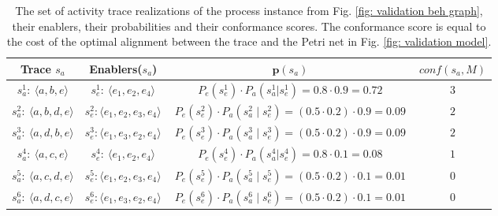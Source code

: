 \begin{table}[h]
	\begin{adjustbox}{width=\columnwidth,center}
	\begin{tabular}{cccc}
		\textbf{Trace $s_a$} & \textbf{Enablers}($s_a$) & \textbf{$\textbf{p}(s_a)$} & \textbf{$conf(s_a,M)$}
		\\ \hline
	\multicolumn{1}{|c|}{$~s_a^{1}: ~ \langle a,b,e \rangle~$} &                                                 	\multicolumn{1}{|c|}{$~s_e^{1}: ~ \langle e_1,e_2,e_4 \rangle~$} & 
	\multicolumn{1}{|c|}{$P_e(s_e^1) \cdot P_a(s_a^1 | s_e^1) 
		=  0.8 \cdot 0.9  = 0.72$}  & 
	\multicolumn{1}{|c|}{$3$} 
\\ \hline  
	\multicolumn{1}{|c|}{$s_a^{2}: ~ \langle a,b,d,e \rangle$} & 
	\multicolumn{1}{|c|}{$s_e^2: \langle e_1,e_2,e_3,e_4 \rangle$} & 
	\multicolumn{1}{|c|}{$~ P_e(s_e^2) \cdot P_a(s_a^2 \mid s_e^2) = (0.5 \cdot 0.2) \cdot 0.9 = 0.09 ~$} &
	\multicolumn{1}{|c|}{$~ 2 ~$}
\\ \hline
	\multicolumn{1}{|c|}{$s_a^{3}: ~ \langle a,d,b,e \rangle$} & 
	\multicolumn{1}{|c|}{$s_e^3: \langle e_1,e_3,e_2,e_4 \rangle$} & 
	\multicolumn{1}{|c|}{$~ P_e(s_e^3) \cdot P_a(s_a^3 \mid s_e^3) =  (0.5 \cdot 0.2) \cdot 0.9 = 0.09 ~$} &
	\multicolumn{1}{|c|}{$~ 2 ~$}
\\ \hline
	\multicolumn{1}{|c|}{$~s_a^{4}: ~ \langle a,c,e \rangle~$} &                                                       	\multicolumn{1}{|c|}{$~s_e^{4}: ~ \langle e_1,e_2,e_4 \rangle~$} & 
	\multicolumn{1}{|c|}{$P_e(s_e^4) \cdot P_a(s_a^4 | s_e^4)
		=0.8 \cdot 0.1 = 0.08$ }  & 
	\multicolumn{1}{|c|}{$1$}  
\\ \hline  
	\multicolumn{1}{|c|}{$s_a^{5}: ~ \langle a,c,d,e \rangle$} & 
	\multicolumn{1}{|c|}{$s_e^5: \langle e_1,e_2,e_3,e_4 \rangle$} & 
	\multicolumn{1}{|c|}{$~ P_e(s_e^5) \cdot P_a(s_a^5 \mid s_e^5) = (0.5 \cdot 0.2) \cdot 0.1 = 0.01~$} &
	\multicolumn{1}{|c|}{$~ 0 ~$}
\\ \hline
	\multicolumn{1}{|c|}{$s_a^{6}: ~ \langle a,d,c,e \rangle$} & 
	\multicolumn{1}{|c|}{$s_e^6: \langle e_1,e_3,e_2,e_4 \rangle$} & 
	\multicolumn{1}{|c|}{$~ P_e(s_e^6) \cdot P_a(s_a^6 \mid s_e^6) = (0.5 \cdot 0.2) \cdot 0.1 = 0.01~$} &
	\multicolumn{1}{|c|}{$~ 0 ~$}
\\ \hline
	\end{tabular}
	\end{adjustbox}
	\caption{The set of activity trace realizations of the process instance from Fig. \ref{fig: validation beh graph}, their enablers, their probabilities and their conformance scores. The conformance score is equal to the cost of the optimal alignment between the trace and the Petri net in Fig. \ref{fig: validation model}.}
	\label{table: validation estimates}
\end{table} 
% 
%
%
%

